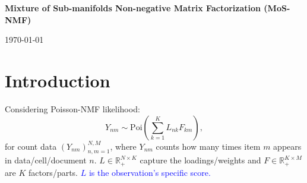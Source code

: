 \documentclass[11pt,twoside]{article}
\theoremstyle{plain}
\numberwithin{theorem}{section}
\numberwithin{proposition}{section}
\numberwithin{lemma}{section}
\numberwithin{definition}{section}
\numberwithin{condition}{section}
\numberwithin{problem}{section}
\numberwithin{corollary}{section}
\numberwithin{assumption}{section}
\numberwithin{example}{section}
\numberwithin{conjecture}{section}
\theoremstyle{definition}
\numberwithin{remark}{section}
\begin{document}
\begin{center}

{\bf{\LARGE{Mixture of Sub-manifolds Non-negative Matrix Factorization (MoS-NMF)}}}

\vspace*{.2in}



\vspace*{.2in}
\today
\vspace*{.2in}
\end{center}

\begin{abstract}
    
\end{abstract}

\section{Introduction}
Considering Poisson-NMF likelihood:
$$Y_{nm} \sim \mathrm{Poi}\left(\sum_{k=1}^{K} L_{nk} F_{km}\right),$$
for count data $(Y_{nm})_{n, m= 1}^{N, M}$, where $Y_{n m}$ counts how many times item $m$ appears in data/cell/document $n$. $L \in \mathbb{R}_{+}^{N\times K}$ capture the loadings/weights and $F \in 
\mathbb{R}_{+}^{K\times M}$ are $K$ factors/parts. \textcolor{blue}{$L$ is the observation's specific score.}
\end{document}
